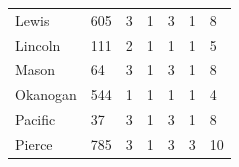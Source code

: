 \documentclass{mcmthesis}
\numberwithin{figure}{section}
\numberwithin{table}{section}
\begin{document}
\begin{table}[H]
\begin{tabular}{lllllll}
  Lewis        & 605                                                    & 3                                                                             & 1                                                                 & 3                                                                           & 1                                                                                     & 8                                                                          \\
  Lincoln      & 111                                                    & 2                                                                             & 1                                                                 & 1                                                                           & 1                                                                                     & 5                                                                          \\
  Mason        & 64                                                     & 3                                                                             & 1                                                                 & 3                                                                           & 1                                                                                     & 8                                                                          \\
  Okanogan     & 544                                                    & 1                                                                             & 1                                                                 & 1                                                                           & 1                                                                                     & 4                                                                          \\
  Pacific      & 37                                                     & 3                                                                             & 1                                                                 & 3                                                                           & 1                                                                                     & 8                                                                          \\
  Pierce       & 785                                                    & 3                                                                             & 1                                                                 & 3                                                                           & 3                                                                                     & 10                                                                         \\

\end{tabular}
\end{table}
\end{document}
